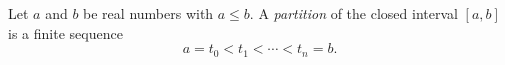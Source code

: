 Let $a$ and $b$ be real numbers with $a \leq b$. A \textit{partition} of the closed interval $[a, b]$ is a finite sequence
$$a = t_0 < t_1 < \cdots < t_n = b.$$
